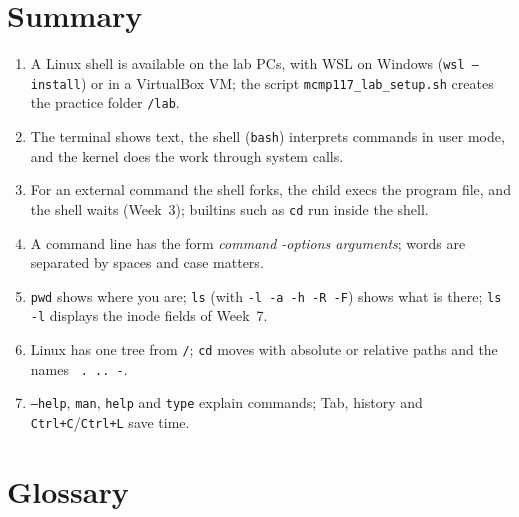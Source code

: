 \documentclass[11pt,a4paper]{article}
\newcommand{\cmd}[1]{\texttt{#1}}
\begin{document}
\section{Summary}

\begin{keyidea}
\begin{enumerate}[leftmargin=1.4em]
  \item A Linux shell is available on the lab PCs, with WSL on Windows (\cmd{wsl --install}) or in a VirtualBox VM; the script \texttt{mcmp117\_lab\_setup.sh} creates the practice folder \texttt{\tl/lab}.
  \item The terminal shows text, the shell (\cmd{bash}) interprets commands in user mode, and the kernel does the work through system calls.
  \item For an external command the shell forks, the child execs the program file, and the shell waits (Week~3); builtins such as \cmd{cd} run inside the shell.
  \item A command line has the form \emph{command -options arguments}; words are separated by spaces and case matters.
  \item \cmd{pwd} shows where you are; \cmd{ls} (with \cmd{-l -a -h -R -F}) shows what is there; \cmd{ls -l} displays the inode fields of Week~7.
  \item Linux has one tree from \texttt{/}; \cmd{cd} moves with absolute or relative paths and the names \texttt{\tl\ . .. -}.
  \item \cmd{--help}, \cmd{man}, \cmd{help} and \cmd{type} explain commands; Tab, history and \texttt{Ctrl+C}/\texttt{Ctrl+L} save time.
\end{enumerate}
\end{keyidea}

\section{Glossary}
\end{document}
